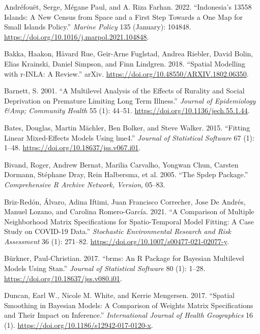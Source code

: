 \hypertarget{refs}{}
\begin{CSLReferences}{1}{0}
\leavevmode{}%
Andréfouët, Serge, Mégane Paul, and A. Riza Farhan. 2022. {``Indonesia's 13558 Islands: A New Census from Space and a First Step Towards a One Map for Small Islands Policy.''} \emph{Marine Policy} 135 (January): 104848. \url{https://doi.org/10.1016/j.marpol.2021.104848}.

\leavevmode{}%
Bakka, Haakon, Håvard Rue, Geir-Arne Fuglstad, Andrea Riebler, David Bolin, Elias Krainski, Daniel Simpson, and Finn Lindgren. 2018. {``Spatial Modelling with r-INLA: A Review.''} arXiv. \url{https://doi.org/10.48550/ARXIV.1802.06350}.

\leavevmode{}%
Barnett, S. 2001. {``A Multilevel Analysis of the Effects of Rurality and Social Deprivation on Premature Limiting Long Term Illness.''} \emph{Journal of Epidemiology \&Amp; Community Health} 55 (1): 44--51. \url{https://doi.org/10.1136/jech.55.1.44}.

\leavevmode{}%
Bates, Douglas, Martin Mächler, Ben Bolker, and Steve Walker. 2015. {``Fitting Linear Mixed-Effects Models Using {lme4}.''} \emph{Journal of Statistical Software} 67 (1): 1--48. \url{https://doi.org/10.18637/jss.v067.i01}.

\leavevmode{}%
Bivand, Roger, Andrew Bernat, Marilia Carvalho, Yongwan Chun, Carsten Dormann, Stéphane Dray, Rein Halbersma, et al. 2005. {``The Spdep Package.''} \emph{Comprehensive R Archive Network, Version}, 05--83.

\leavevmode{}%
Briz-Redón, Álvaro, Adina Iftimi, Juan Francisco Correcher, Jose De Andrés, Manuel Lozano, and Carolina Romero-García. 2021. {``A Comparison of Multiple Neighborhood Matrix Specifications for Spatio-Temporal Model Fitting: A Case Study on COVID-19 Data.''} \emph{Stochastic Environmental Research and Risk Assessment} 36 (1): 271--82. \url{https://doi.org/10.1007/s00477-021-02077-y}.

\leavevmode{}%
Bürkner, Paul-Christian. 2017. {``{brms}: An {R} Package for {Bayesian} Multilevel Models Using {Stan}.''} \emph{Journal of Statistical Software} 80 (1): 1--28. \url{https://doi.org/10.18637/jss.v080.i01}.

\leavevmode{}%
Duncan, Earl W., Nicole M. White, and Kerrie Mengersen. 2017. {``Spatial Smoothing in Bayesian Models: A Comparison of Weights Matrix Specifications and Their Impact on Inference.''} \emph{International Journal of Health Geographics} 16 (1). \url{https://doi.org/10.1186/s12942-017-0120-x}.


\end{CSLReferences}
